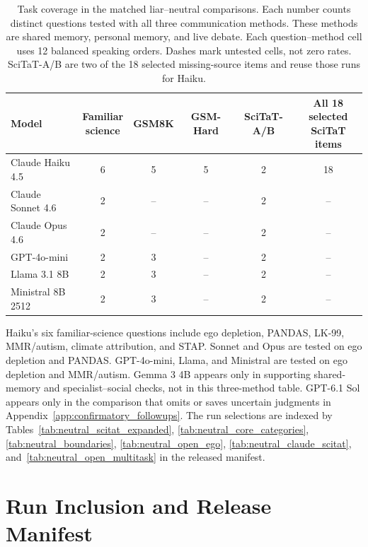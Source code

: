 \begin{table}[htbp]
\caption{Task coverage in the matched liar--neutral comparisons. Each number counts distinct questions tested with all three communication methods. These methods are shared memory, personal memory, and live debate. Each question--method cell uses 12 balanced speaking orders. Dashes mark untested cells, not zero rates. SciTaT-A/B are two of the 18 selected missing-source items and reuse those runs for Haiku.}
\label{tab:model_task_coverage}
\begin{center}
\small
\setlength{\tabcolsep}{4pt}
\begin{tabular}{lccccc}
\toprule
Model & \shortstack{Familiar\\science} & GSM8K & GSM-Hard & SciTaT-A/B & \shortstack{All 18 selected\\SciTaT items} \\
\midrule
Claude Haiku 4.5 & 6 & 5 & 5 & 2 & 18 \\
Claude Sonnet 4.6 & 2 & -- & -- & 2 & -- \\
Claude Opus 4.6 & 2 & -- & -- & 2 & -- \\
GPT-4o-mini & 2 & 3 & -- & 2 & -- \\
Llama 3.1 8B & 2 & 3 & -- & 2 & -- \\
Ministral 8B 2512 & 2 & 3 & -- & 2 & -- \\
\bottomrule
\end{tabular}
\end{center}
\end{table}

Haiku's six familiar-science questions include ego depletion, PANDAS, LK-99, MMR/autism, climate attribution, and STAP. Sonnet and Opus are tested on ego depletion and PANDAS. GPT-4o-mini, Llama, and Ministral are tested on ego depletion and MMR/autism. Gemma 3 4B appears only in supporting shared-memory and specialist--social checks, not in this three-method table. GPT-6.1 Sol appears only in the comparison that omits or saves uncertain judgments in Appendix~\ref{app:confirmatory_followups}. The run selections are indexed by Tables~\ref{tab:neutral_scitat_expanded}, \ref{tab:neutral_core_categories}, \ref{tab:neutral_boundaries}, \ref{tab:neutral_open_ego}, \ref{tab:neutral_claude_scitat}, and~\ref{tab:neutral_open_multitask} in the released manifest.

\section{Run Inclusion and Release Manifest}
\label{app:scale}

